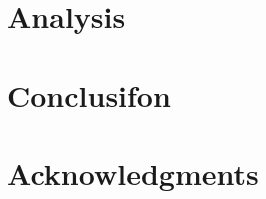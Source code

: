 \documentclass[10pt, conference, compsocconf]{IEEEtran}
\begin{document}
\section{Analysis}





\section{Conclusifon} \label{S:conclusion}





\section{Acknowledgments}

 

% 


\end{document}
